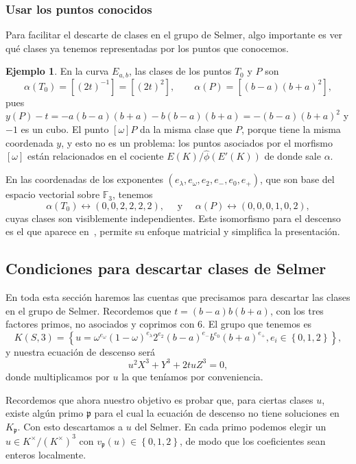 \documentclass[a4paper]{book}
\theoremstyle{definition}
\newtheorem{example}[definition]{Ejemplo}
\theoremstyle{plain}
\newcommand{\FF}{\mathbb{F}}
\newcommand{\pp}{\mathfrak{p}}
\newcommand{\KmodT}{K^\times/{(K^\times)}^3}
\newcommand{\lla}{\left\lbrace}
\newcommand{\rla}{\right\rbrace}
\begin{document}
\subsubsection*{Usar los puntos conocidos}

Para facilitar el descarte de clases en el grupo de Selmer, algo importante es ver qué clases ya tenemos representadas por los puntos que conocemos.

\begin{example}
En la curva $E_{a,b}$, las clases de los puntos $T_0$ y $P$ son
\[
\alpha(T_0)=[{(2t)}^{-1}]=[{(2t)}^2],\qquad
\alpha(P)=[(b-a){(b+a)}^2],
\]
pues $y(P)-t= -a(b-a)(b+a)-b(b-a)(b+a) =-(b-a){(b+a)}^2$ y $-1$ es un cubo. El punto $[\omega]P$ da la misma clase que $P$, porque tiene la misma coordenada $y$, y esto no es un problema: los puntos asociados por el morfismo $[\omega]$ están relacionados en el cociente $E(K)/\hat\phi (E'(K))$ de donde sale $\alpha$.

En las coordenadas de los exponentes $(e_\lambda, e_\omega,e_2,e_-,e_0,e_+)$, que son base del espacio vectorial sobre $\FF_3$, tenemos
\[
\alpha(T_0)\longleftrightarrow(0,0,2,2,2,2),\quad \text{ y } \quad
\alpha(P)\longleftrightarrow(0,0,0,1,0,2),
\]
cuyas clases son visiblemente independientes. Este isomorfismo para el descenso es el que aparece en~\cite{KlingSavoie2025}, permite su enfoque matricial y simplifica la presentación.
\end{example}

\subsection{Condiciones para descartar clases de Selmer}

En toda esta sección haremos las cuentas que precisamos para descartar las clases en el grupo de Selmer. Recordemos que $t=(b-a)b(b+a)$, con los tres factores primos, no asociados y coprimos con $6$. El grupo que tenemos es 
\begin{equation*}
K(S,3) = \lla u= \omega^{e_\omega}{(1-\omega)}^{e_\lambda}2^{e_2} {(b-a)}^{e_-} b^{e_0} {(b+a)}^{e_+}, e_i\in\lla0,1,2\rla \rla,
\end{equation*}
y nuestra ecuación de descenso será 
\begin{equation}\label{eq:cubicaIntegral}
u^2 X^3 + Y^3 + 2tu Z^3=0,
\end{equation}
donde multiplicamos por $u$ la que teníamos por conveniencia.

Recordemos que ahora nuestro objetivo es probar que, para ciertas clases $u$, existe algún primo $\pp$ para el cual la ecuación de descenso no tiene soluciones en $K_\pp$. Con esto descartamos a $u$ del Selmer. En cada primo podemos elegir un $u\in \KmodT$ con $v_\pp(u)\in\lla 0,1,2 \rla$, de modo que los coeficientes sean enteros localmente.
\end{document}

